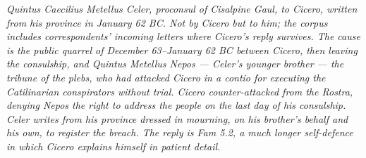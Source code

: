 
\textit{Quintus Caecilius Metellus Celer, proconsul of
Cisalpine Gaul, to Cicero, written from his province in
January 62 BC. Not by Cicero but to him; the corpus
includes correspondents' incoming letters where Cicero's
reply survives. The cause is the public quarrel of
December 63--January 62 BC between Cicero, then leaving
the consulship, and Quintus Metellus Nepos --- Celer's
younger brother --- the tribune of the plebs, who had
attacked Cicero in a contio for executing the
Catilinarian conspirators without trial. Cicero
counter-attacked from the Rostra, denying Nepos the
right to address the people on the last day of his
consulship. Celer writes from his province dressed in
mourning, on his brother's behalf and his own, to
register the breach. The reply is Fam 5.2, a much
longer self-defence in which Cicero explains himself
in patient detail.}
